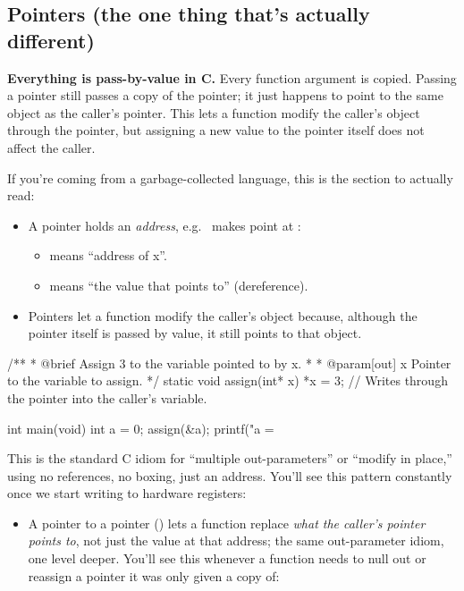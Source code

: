 \subsection{Pointers (the one thing that's actually different)}
\label{c1:a:7}

\begin{aside}
\textbf{Everything is pass-by-value in C.} Every function argument is copied. Passing a pointer
still passes a copy of the pointer; it just happens to point to the same object as the caller's
pointer. This lets a function modify the caller's object through the pointer, but assigning a new
value to the pointer itself does not affect the caller.
\end{aside}

\noindent If you're coming from a garbage-collected language, this is the section to actually read:
\begin{itemize}
  \item A pointer holds an \emph{address}, e.g.\  makes  point at
    :
  \begin{itemize}
    \item {} means ``address of x''.
    \item {} means ``the value that  points to'' (dereference).
  \end{itemize}
  \item Pointers let a function modify the caller's object because, although the pointer itself is
    passed by value, it still points to that object.
\end{itemize}

\begin{ccode}
/**
 * @brief Assign 3 to the variable pointed to by x.
 *
 * @param[out] x Pointer to the variable to assign.
 */
static void assign(int* x)
{
    *x = 3; // Writes through the pointer into the caller's variable.
}

int main(void)
{
    int a = 0;
    assign(&a);
    printf("a = %
}
\end{ccode}

\noindent This is the standard C idiom for ``multiple out-parameters'' or ``modify in place,''
using no references, no boxing, just an address. You'll see this pattern constantly once we start
writing to hardware registers:
\begin{itemize}
  \item A pointer to a pointer () lets a function replace \emph{what the caller's
    pointer points to}, not just the value at that address; the same out-parameter idiom, one level
    deeper. You'll see this whenever a function needs to null out or reassign a pointer it was only
    given a copy of:
\end{itemize}


